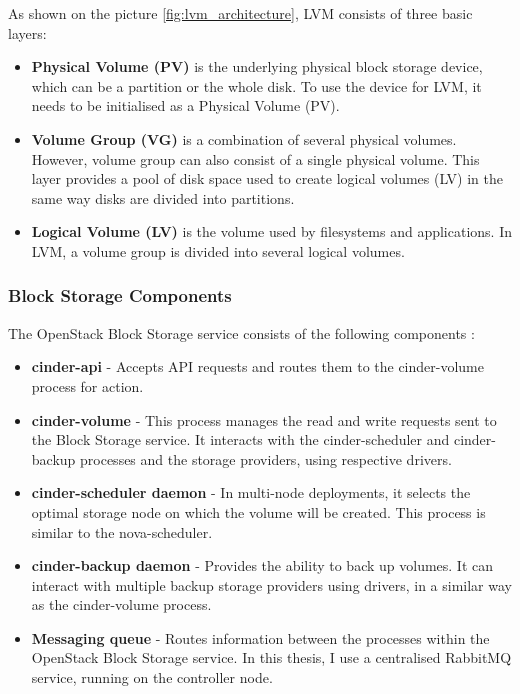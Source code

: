 As shown on the picture \ref{fig:lvm_architecture}, LVM consists of three basic layers:
\begin{itemize}
\item{\textbf{Physical Volume (PV)} is the underlying physical block storage device, which can be a partition or the whole disk. To use the device for LVM, it needs to be initialised as a Physical Volume (PV).}
\item{\textbf{Volume Group (VG)} is a combination of several physical volumes. However, volume group can also consist of a single physical volume. This layer provides a pool of disk space used to create logical volumes (LV) in the same way disks are divided into partitions.}
\item{\textbf{Logical Volume (LV)} is the volume used by filesystems and applications. In LVM, a volume group is divided into several logical volumes.}
\end{itemize}

\subsubsection*{Block Storage Components}

The OpenStack Block Storage service consists of the following components \cite{InstallGuide}:
\begin{itemize}
\item{\textbf{cinder-api} - Accepts API requests and routes them to the cinder-volume process for action.}
\item{\textbf{cinder-volume} - This process manages the read and write requests sent to the Block Storage service. It interacts with the cinder-scheduler and cinder-backup processes and the storage providers, using respective drivers.}
\item{\textbf{cinder-scheduler daemon} - In multi-node deployments, it selects the optimal storage node on which the volume will be created. This process is similar to the nova-scheduler.}
\item{\textbf{cinder-backup daemon} - Provides the ability to back up volumes. It can interact with multiple backup storage providers using drivers, in a similar way as the cinder-volume process.}
\item{\textbf{Messaging queue} - Routes information between the processes within the OpenStack Block Storage service. In this thesis, I use a centralised RabbitMQ service, running on the controller node.}
\end{itemize}




